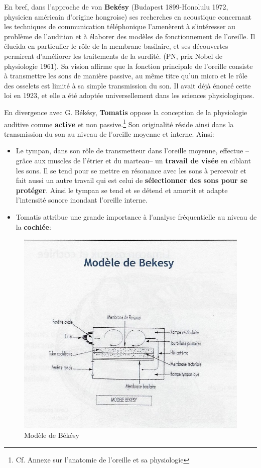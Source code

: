 En bref, dans  l'approche de von\textbf{ Bekésy} (Budapest 1899-Honolulu 1972,
physicien américain d'origine hongroise) ses
recherches en acoustique concernant les techniques de communication
téléphonique l'amenèrent à s'intéresser au problème de l'audition et à
élaborer des modèles de fonctionnement de l'oreille. Il élucida en
particulier le rôle de la membrane basilaire, et ses découvertes
permirent d'améliorer les traitements de la surdité.  (PN, prix 
Nobel de physiologie 1961).
Sa vision affirme que la fonction principale de l'oreille
consiste à transmettre les sons de manière passive, au même titre qu'un micro et le rôle des osselets 
est limité à sa simple transmission du
son. Il avait déjà énoncé cette loi en 1923, et elle a été adoptée
universellement dans les sciences physiologiques.


En divergence avec G. Békésy, \textbf{Tomatis} oppose la conception de la 
physiologie auditive comme \textbf{active} et non passive.\footnote{Cf. Annexe sur l'anatomie de l'oreille et sa physiologie}
Son originalité réside ainsi dans la transmission du son
au niveau de l'oreille moyenne et interne. Ainsi: 



\begin{itemize}
	\item Le tympan, dans son rôle de transmetteur dans l'oreille
          moyenne, effectue --grâce aux muscles de l'étrier et du marteau--
		un\textbf{ travail de visée} en ciblant les sons. Il 
se tend
		pour se mettre en résonance avec les sons à percevoir
                et fait aussi un autre travail qui est celui de \textbf{sélectionner des 
sons
		pour se protéger}. Ainsi le tympan se tend et se détend et
              amortit et adapte 
l'intensité
		sonore inondant  l'oreille interne. 

	\item Tomatis attribue une grande importance à l'analyse
          fréquentielle au niveau de la\textbf{ cochlée}: 
\end{itemize}








\begin{figure}
	\centering
	\includegraphics[width=0.7\linewidth]{images/Cochleederoule_bas.jpg}
	\caption[Modèle de Békésy]{Modèle de Békésy}
	\label{fig:cochleederoulebas}
\end{figure}



